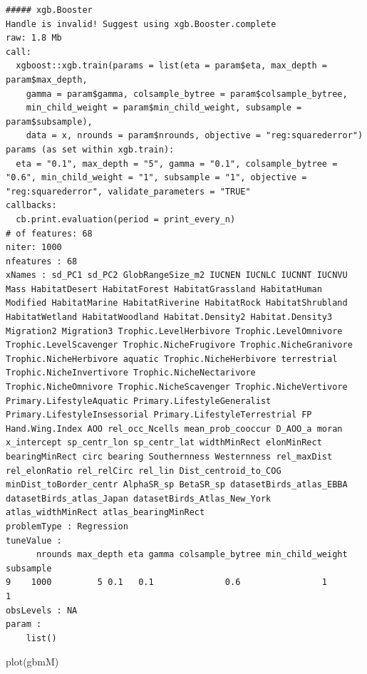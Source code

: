 \documentclass[
  letterpaper,
  DIV=11,
  numbers=noendperiod]{scrreprt}
\newenvironment{Shaded}{\begin{snugshade}}{\end{snugshade}}
\newcommand{\FunctionTok}[1]{\textcolor[rgb]{0.28,0.35,0.67}{#1}}
\newcommand{\NormalTok}[1]{\textcolor[rgb]{0.00,0.23,0.31}{#1}}
\begin{document}
\begin{verbatim}
##### xgb.Booster
Handle is invalid! Suggest using xgb.Booster.complete
raw: 1.8 Mb 
call:
  xgboost::xgb.train(params = list(eta = param$eta, max_depth = param$max_depth, 
    gamma = param$gamma, colsample_bytree = param$colsample_bytree, 
    min_child_weight = param$min_child_weight, subsample = param$subsample), 
    data = x, nrounds = param$nrounds, objective = "reg:squarederror")
params (as set within xgb.train):
  eta = "0.1", max_depth = "5", gamma = "0.1", colsample_bytree = "0.6", min_child_weight = "1", subsample = "1", objective = "reg:squarederror", validate_parameters = "TRUE"
callbacks:
  cb.print.evaluation(period = print_every_n)
# of features: 68 
niter: 1000
nfeatures : 68 
xNames : sd_PC1 sd_PC2 GlobRangeSize_m2 IUCNEN IUCNLC IUCNNT IUCNVU Mass HabitatDesert HabitatForest HabitatGrassland HabitatHuman Modified HabitatMarine HabitatRiverine HabitatRock HabitatShrubland HabitatWetland HabitatWoodland Habitat.Density2 Habitat.Density3 Migration2 Migration3 Trophic.LevelHerbivore Trophic.LevelOmnivore Trophic.LevelScavenger Trophic.NicheFrugivore Trophic.NicheGranivore Trophic.NicheHerbivore aquatic Trophic.NicheHerbivore terrestrial Trophic.NicheInvertivore Trophic.NicheNectarivore Trophic.NicheOmnivore Trophic.NicheScavenger Trophic.NicheVertivore Primary.LifestyleAquatic Primary.LifestyleGeneralist Primary.LifestyleInsessorial Primary.LifestyleTerrestrial FP Hand.Wing.Index AOO rel_occ_Ncells mean_prob_cooccur D_AOO_a moran x_intercept sp_centr_lon sp_centr_lat widthMinRect elonMinRect bearingMinRect circ bearing Southernness Westernness rel_maxDist rel_elonRatio rel_relCirc rel_lin Dist_centroid_to_COG minDist_toBorder_centr AlphaSR_sp BetaSR_sp datasetBirds_atlas_EBBA datasetBirds_atlas_Japan datasetBirds_Atlas_New_York atlas_widthMinRect atlas_bearingMinRect 
problemType : Regression 
tuneValue :
      nrounds max_depth eta gamma colsample_bytree min_child_weight subsample
9    1000         5 0.1   0.1              0.6                1         1
obsLevels : NA 
param :
    list()
\end{verbatim}

\begin{Shaded}
\begin{Highlighting}[]
\FunctionTok{plot}\NormalTok{(gbmM)}
\end{Highlighting}
\end{Shaded}
\end{document}
